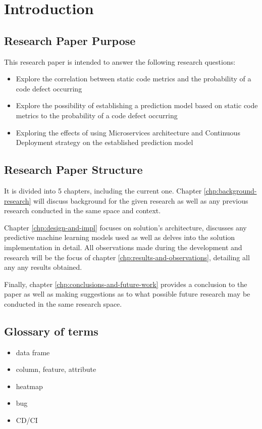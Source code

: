 \chapter{Introduction}\label{chp:intro}
\section{Research Paper Purpose}
This research paper is intended to answer the following research questions:
\begin{itemize}
\item Explore the correlation between static code metrics and the probability of a code defect occurring
\item Explore the possibility of establishing a prediction model based on static code metrics to the probability of a code defect occurring 
\item Exploring the effects of using Microservices architecture and Continuous Deployment strategy on the established prediction model
\end{itemize}
\section{Research Paper Structure}
It is divided into 5 chapters, including the current one. Chapter \ref{chp:background-research} will discuss background for the given research as well as any previous research conducted in the same space and context. 

Chapter \ref{chp:design-and-impl} focuses on solution's architecture, discusses any predictive machine learning models used as well as delves into the solution implementation in detail. All observations made during the development and research will be the focus of chapter \ref{chp:results-and-observations}, detailing all any any results obtained.

Finally, chapter \ref{chp:conclusions-and-future-work} provides a conclusion to the paper as well as making suggestions as to what possible future research may be conducted in the same research space.

\section{Glossary of terms}
\begin{itemize}
    \item data frame
    \item column, feature, attribute
    \item heatmap
    \item bug
    \item CD/CI
\end{itemize}